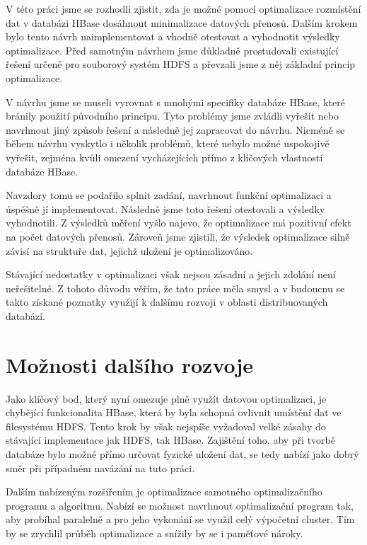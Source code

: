 \documentclass[thesis=M,czech]{FITthesis}[2012/06/26]
\begin{document}
\begin{conclusion}
	V této práci jsme se rozhodli zjistit, zda je možné pomocí optimalizace rozmístění dat v databázi HBase dosáhnout minimalizace datových přenosů. Dalším krokem bylo tento návrh naimplementovat a vhodně otestovat a vyhodnotit výsledky optimalizace. Před samotným návrhem jsme důkladně prostudovali existující řešení určené pro souborový systém HDFS a převzali jsme z něj základní princip optimalizace. 
	
V návrhu jsme se museli vyrovnat s mnohými specifiky databáze HBase, které bránily použití původního principu. Tyto problémy jsme zvládli vyřešit nebo navrhnout jiný způsob řešení a následně jej zapracovat do návrhu. Nicméně se během návrhu vyskytlo i několik problémů, které nebylo možné uspokojivě vyřešit, zejména kvůli omezení vycházejících přímo z klíčových vlastností databáze HBase.

Navzdory tomu se podařilo splnit zadání, navrhnout funkční optimalizaci a úspěšně jí implementovat. Následně jsme toto řešení otestovali a výsledky vyhodnotili. Z výsledků měření vyšlo najevo, že optimalizace má pozitivní efekt na počet datových přenosů. Zároveň jsme zjistili, že výsledek optimalizace silně závisí na struktuře dat, jejichž uložení je optimalizováno. 

Stávající nedostatky v optimalizaci však nejsou zásadní a jejich zdolání není neřešitelné. Z tohoto důvodu věřím, že tato práce měla smysl a v budoucnu se takto získané poznatky využijí k dalšímu rozvoji v oblasti distribuovaných databází.

\section{Možnosti dalšího rozvoje}
Jako klíčový bod, který nyní omezuje plně využít datovou optimalizaci, je chybějící funkcionalita HBase, která by byla schopná ovlivnit umístění dat ve filesystému HDFS. Tento krok by však nejspíše vyžadoval velké zásahy do stávající implementace jak HDFS, tak HBase. Zajištění toho, aby při tvorbě databáze bylo možné přímo určovat fyzické uložení dat, se tedy nabízí jako dobrý směr při případném navázání na tuto práci.

Dalším nabízeným rozšířením je optimalizace samotného optimalizačního programu a algoritmu. Nabízí se možnost navrhnout optimalizační program tak, aby probíhal paralelně a pro jeho vykonání se využil celý výpočetní cluster. Tím by se zrychlil průběh optimalizace a snížily by se i paměťové nároky.







	
	
	\end{conclusion}
\end{document}
